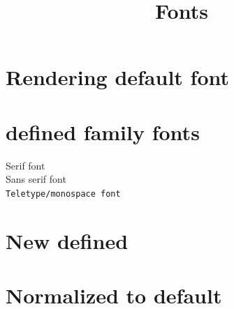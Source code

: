 \documentclass[36px]{article}
\title{Fonts}
\begin{document}
	\maketitle

	\noindent
	\section{Rendering default font}
	\lipsum[1][1-3]

	\section{defined family fonts}
	\textrm{Serif font}\\
	\textsf{Sans serif font}\\
	\texttt{Teletype/monospace font}

	\section{New defined}
	\rmfamily
	\lipsum[1]


	\section{Normalized to default}
	\normalfont
	\lipsum[1]
\end{document}
